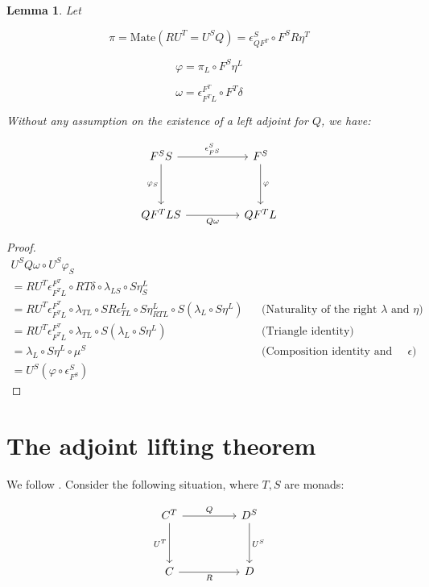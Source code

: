 \documentclass[10pt, oneside]{article}
\newtheorem{lemma}[theorem]{Lemma}
\begin{document}
\begin{lemma}
    Let

    $$\pi = \mathrm{Mate}(R U^T = U^S Q) = \epsilon^S_{Q F^T} \circ F^S R \eta^T$$

    $$\varphi = \pi_L \circ F^S \eta^L$$

    $$\omega = \epsilon^{F^T}_{F^T L} \circ F^T \delta$$

    Without any assumption on the existence of a left adjoint for $Q$, we have:

    \[\begin{tikzcd}[ampersand replacement=\&]
	{F^SS} \&\& {F^S} \\
	\\
	{Q F^T L S} \&\& {Q F^T L}
	\arrow["\varphi", from=1-3, to=3-3]
	\arrow["{Q \omega}"', from=3-1, to=3-3]
	\arrow["{\varphi_S}"', from=1-1, to=3-1]
	\arrow["{\epsilon^S_{F^S}}", from=1-1, to=1-3]
\end{tikzcd}\]
\end{lemma}
\begin{proof}
    \begin{align*}
        U^S Q \omega \circ U^S \varphi_S
        \\ = R U^T \epsilon^{F^T}_{F^T L} \circ RT \delta \circ \lambda_{L S} \circ S \eta^L_S
        \\ = R U^T \epsilon^{F^T}_{F^T L}  \circ \lambda_{T L} \circ S R \epsilon^L_{T L} \circ S \eta^L_{RTL} \circ S (\lambda_L \circ S \eta^L) && \text{(Naturality of the right $\lambda$ and $\eta$)} \\
        = R U^T \epsilon^{F^T}_{F^T L}  \circ \lambda_{T L} \circ S (\lambda_L \circ S \eta^L) && \text{(Triangle identity)}
        \\ = \lambda_L \circ S \eta^L \circ \mu^S && \text{(Composition identity and naturality of $\epsilon$)}
        \\ = U^S (\varphi \circ \epsilon^{S}_{F^S})
    \end{align*}
\end{proof}

\section{The adjoint lifting theorem}

We follow \cite[Chapter 4.5]{Borceux1994}. Consider the following situation, where $T, S$ are monads:

\[\begin{tikzcd}[ampersand replacement=\&]
	{C^T} \&\& {D^S} \\
	\\
	C \&\& D
	\arrow["Q", from=1-1, to=1-3]
	\arrow["R"', from=3-1, to=3-3]
	\arrow["{U^T}"', from=1-1, to=3-1]
	\arrow["{U^S}", from=1-3, to=3-3]
\end{tikzcd}\]
\end{document}
